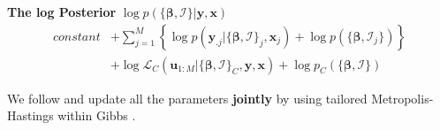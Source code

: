 \documentclass[a0paper,portrait,fontscale = 0.39,margin=2.5em]{baposter/baposter}
\begin{document}
\begin{poster}
{\begin{multicols}{2}
\begin{compactitem}
\begin{itemize}
    \end{itemize}


      \item \textbf{The log Posterior} {\color{blue} $\log p(\{\bm{\beta},\bm{\mathcal{I}}\}|\bm{y},\bm{x})$}
        {\footnotesize
          \begin{align*}
                constant&+\sum\nolimits _{j=1}^{M}\left\{\log
                          p(\bm{y}_{.j}|\{\bm{\beta},\bm{\mathcal{I}}\}_{j},\bm{x}_{j}) + \log p(\{\bm{\beta},\bm{\mathcal{I}}_j\}) \right\}\\
              & +\log\mathcal{L}_{C}(\bm{u}_{1:M}|\{\bm{\beta},\bm{\mathcal{I}}\}_{C},\bm{y},\bm{x})+
                \log p_C(\{\bm{\beta},\bm{\mathcal{I}}\})
          \end{align*}
        }

      \item We follow {\color{blue} \citet{li2013modeling}} and update all the parameters
        \textbf{jointly} by using tailored Metropolis-Hastings within Gibbs .


\end{compactitem}
\end{multicols}}
\end{poster}
\end{document}
